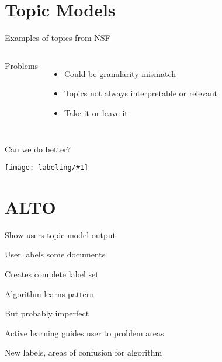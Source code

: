 \documentclass[compress]{beamer}
\newcommand{\gfx}[2]{
\begin{center}
	\texttt{[image: labeling/\#1]}
\end{center}
}
\begin{document}
\section{Topic Models}

\begin{frame}{Examples of topics from NSF}

\begin{columns}


\pause

Problems
\begin{itemize}
 \item Could be granularity mismatch
  \item Topics not always interpretable or relevant
  \item Take it or leave it
\end{itemize}

\end{columns}

\end{frame}

\begin{frame}{Can we do better?}

\gfx{alto_qc}{.5}

\centering
{}

\end{frame}


\section{ALTO}



\begin{frame}{Show users topic model output}

\end{frame}


\begin{frame}{User labels some documents}

\pause
\centering
Creates complete label set

\end{frame}

\begin{frame}{Algorithm learns pattern}

\pause
\centering
But probably imperfect
\end{frame}


\begin{frame}{Active learning guides user to problem areas}

\pause
\centering
New labels, areas of confusion for algorithm

\end{frame}
\end{document}
